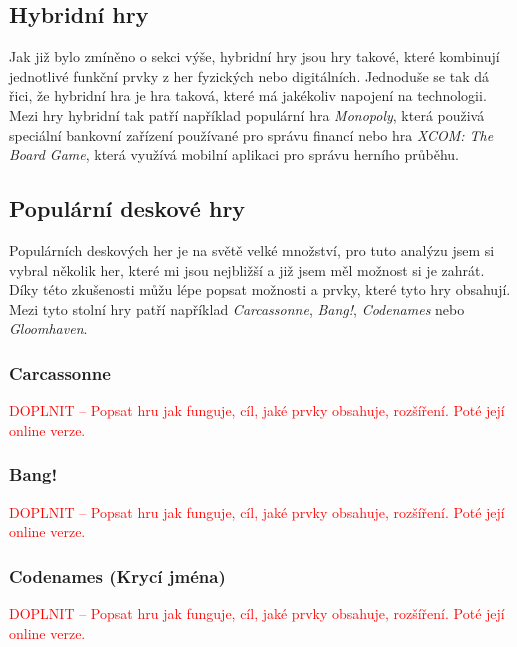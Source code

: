 \subsection*{Hybridní hry}
\label{subsec:popular-board-games-analysis-hybrid-games}
Jak již bylo zmíněno o sekci výše, hybridní hry jsou hry takové, které kombinují jednotlivé funkční prvky z her fyzických nebo digitálních. Jednoduše se tak dá řici, že hybridní hra je hra taková, které má jakékoliv napojení na technologii. Mezi hry hybridní tak patří například populární hra \textit{Monopoly}, která použivá speciální bankovní zařízení používané pro správu financí nebo hra \textit{XCOM: The Board Game}, která využívá mobilní aplikaci pro správu herního průběhu.

\subsection{Populární deskové hry}
\label{subsec:popular-board-games-analysis-popular-games}
Populárních deskových her je na světě velké množství, pro tuto analýzu jsem si vybral několik her, které mi jsou nejbližší a již jsem měl možnost si je zahrát. Díky této zkušenosti můžu lépe popsat možnosti a prvky, které tyto hry obsahují. Mezi tyto stolní hry patří například \textit{Carcassonne}, \textit{Bang!}, \textit{Codenames} nebo \textit{Gloomhaven}.

\subsubsection{Carcassonne}
\label{subsubsec:popular-board-games-analysis-carcassonne}
\textcolor{red}{DOPLNIT -- Popsat hru jak funguje, cíl, jaké prvky obsahuje, rozšíření. Poté její online verze.}

\subsubsection{Bang!}
\label{subsubsec:popular-board-games-analysis-bang}
\textcolor{red}{DOPLNIT -- Popsat hru jak funguje, cíl, jaké prvky obsahuje, rozšíření. Poté její online verze.}

\subsubsection{Codenames (Krycí jména)}
\label{subsubsec:popular-board-games-analysis-codenames}
\textcolor{red}{DOPLNIT -- Popsat hru jak funguje, cíl, jaké prvky obsahuje, rozšíření. Poté její online verze.}

